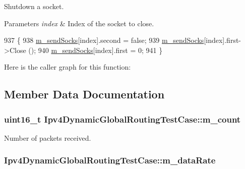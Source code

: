 Shutdown a socket. 


\begin{DoxyParams}{Parameters}
{\em index} & Index of the socket to close. \\
\hline
\end{DoxyParams}

\begin{DoxyCode}
937 \{
938   \hyperlink{classIpv4DynamicGlobalRoutingTestCase_ab5c3600b2f8c2e1fa3b91977e7d4a3d0}{m\_sendSocks}[index].second = \textcolor{keyword}{false};
939   \hyperlink{classIpv4DynamicGlobalRoutingTestCase_ab5c3600b2f8c2e1fa3b91977e7d4a3d0}{m\_sendSocks}[index].first->Close ();
940   \hyperlink{classIpv4DynamicGlobalRoutingTestCase_ab5c3600b2f8c2e1fa3b91977e7d4a3d0}{m\_sendSocks}[index].first = 0;
941 \}
\end{DoxyCode}


Here is the caller graph for this function\+:




\subsection{Member Data Documentation}
\subsubsection[{\texorpdfstring{m\+\_\+count}{m_count}}]{\setlength{\rightskip}{0pt plus 5cm}uint16\+\_\+t Ipv4\+Dynamic\+Global\+Routing\+Test\+Case\+::m\+\_\+count\hspace{0.3cm}{\ttfamily [private]}}\hypertarget{classIpv4DynamicGlobalRoutingTestCase_a92ca312da11a0ad225fb2175c6efe639}{}\label{classIpv4DynamicGlobalRoutingTestCase_a92ca312da11a0ad225fb2175c6efe639}


Number of packets received. 

\subsubsection[{\texorpdfstring{m\+\_\+data\+Rate}{m_dataRate}}]{ Ipv4\+Dynamic\+Global\+Routing\+Test\+Case\+::m\+\_\+data\+Rate\hspace{0.3cm}{\ttfamily [private]}}\hypertarget{classIpv4DynamicGlobalRoutingTestCase_a9ea91681c005ee131e98cd118678b5f1}{}\label{classIpv4DynamicGlobalRoutingTestCase_a9ea91681c005ee131e98cd118678b5f1}


